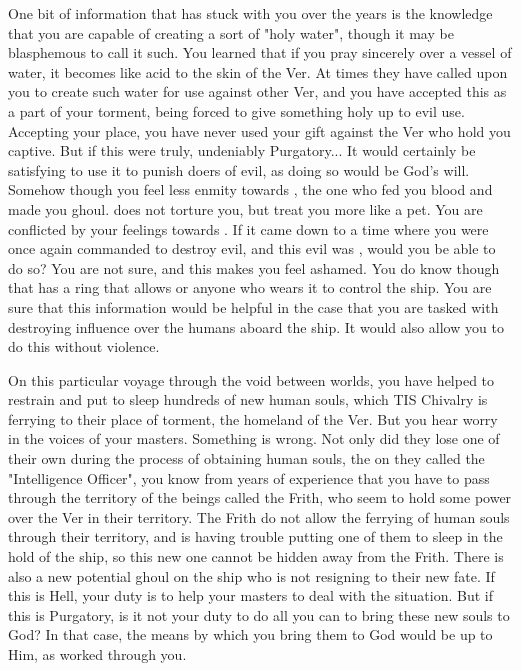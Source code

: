 \documentclass[char]{guildcamp4}
\begin{document}
One bit of information that has stuck with you over the years is the knowledge that you are capable of creating a sort of "holy water", though it may be blasphemous to call it such. You learned that if you pray sincerely over a vessel of water, it becomes like acid to the skin of the Ver. At times they have called upon you to create such water for use against other Ver, and you have accepted this as a part of your torment, being forced to give something holy up to evil use. Accepting your place, you have never used your gift against the Ver who hold you captive. But if this were truly, undeniably Purgatory... It would certainly be satisfying to use it to punish doers of evil, as doing so would be God's will. Somehow though you feel less enmity towards \cVone{}, the one who fed you \cVone{\their} blood and made you \cVone{\their} ghoul. \cVone{\They} does not torture you, but treat you more like a pet. You are conflicted by your feelings towards \cVone{\them}. If it came down to a time where you were once again commanded to destroy evil, and this evil was \cVone{\them}, would you be able to do so? You are not sure, and this makes you feel ashamed. You do know though that \cVone{} has a ring that allows \cVone{\them} or anyone who wears it to control the ship. You are sure that this information would be helpful in the case that you are tasked with destroying \cVone{\their} influence over the humans aboard the ship. It would also allow you to do this without violence.

On this particular voyage through the void between worlds, you have helped to restrain and put to sleep hundreds of new human souls, which TIS Chivalry is ferrying to their place of torment, the homeland of the Ver. But you hear worry in the voices of your masters. Something is wrong. Not only did they lose one of their own during the process of obtaining human souls, the on they called the "Intelligence Officer", you know from years of experience that you have to pass through the territory of the beings called the Frith, who seem to hold some power over the Ver in their territory. The Frith do not allow the ferrying of human souls through their territory, and \cVthree{} is having trouble putting one of them to sleep in the hold of the ship, so this new one cannot be hidden away from the Frith. There is also a new potential ghoul on the ship who is not resigning to their new fate. If this is Hell, your duty is to help your masters to deal with the situation. But if this is Purgatory, is it not your duty to do all you can to bring these new souls to God? In that case, the means by which you bring them to God would be up to Him, as worked through you.
\end{document}
